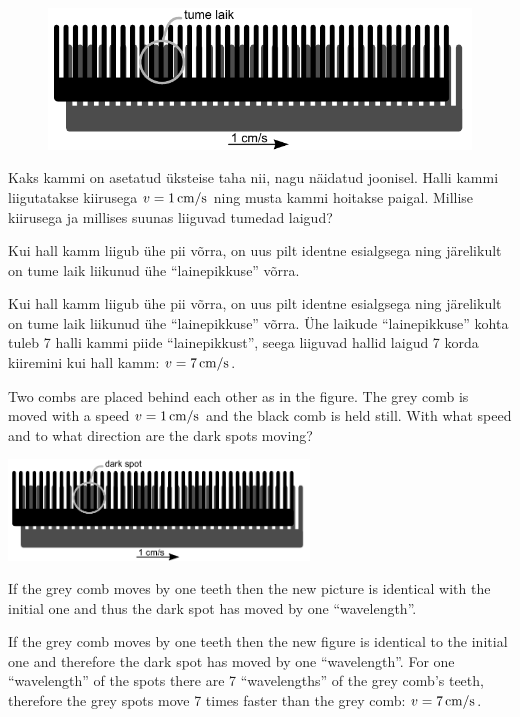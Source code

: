 
\begin{figure}%
\includegraphics[width=1\linewidth]{2014-v3g-05-kammid}
\end{figure}

Kaks kammi on asetatud üksteise taha nii, nagu näidatud joonisel. Halli kammi liigutatakse kiirusega $v=\SI 1{cm/s}$ ning musta kammi hoitakse paigal. Millise kiirusega ja millises suunas liiguvad tumedad laigud?

\hint
Kui hall kamm liigub ühe pii võrra, on uus pilt identne esialgsega ning järelikult on tume laik liikunud ühe \enquote{lainepikkuse} võrra.

\solu
Kui hall kamm liigub ühe pii võrra, on uus pilt identne esialgsega ning järelikult on tume laik liikunud ühe \enquote{lainepikkuse} võrra. 
Ühe laikude \enquote{lainepikkuse} kohta tuleb 7 halli kammi piide \enquote{lainepikkust}, seega liiguvad hallid laigud 7 korda kiiremini kui hall kamm: $v=\SI 7{cm/s}$.

Two combs are placed behind each other as in the figure. The grey comb is moved with a speed $v=\SI 1{cm/s}$ and the black comb is held still.  With what speed and to what direction are the dark spots moving?
\begin{center}
\includegraphics[width=0.6\textwidth]{2014-v3g-05-kammid_ing}
\end{center}

\hinteng
If the grey comb moves by one teeth then the new picture is identical with the initial one and thus the dark spot has moved by one “wavelength”.

\solueng
If the grey comb moves by one teeth then the new figure is identical to the initial one and therefore the dark spot has moved by one “wavelength”. For one “wavelength” of the spots there are 7 “wavelengths” of the grey comb’s teeth, therefore the grey spots move 7 times faster than the grey comb: $v=\SI 7{cm/s}$.
\probend